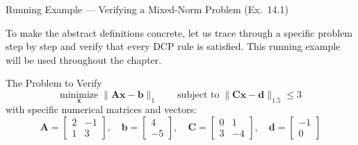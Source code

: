 \documentclass[aspectratio=169,10pt]{beamer}
\begin{document}
\begin{frame}[allowframebreaks]{Running Example --- Verifying a Mixed-Norm Problem (Ex.\ 14.1)}

  To make the abstract definitions concrete, let us trace through a
  specific problem step by step and verify that every DCP rule is
  satisfied.  This running example will be used throughout the chapter.

  \begin{exampleblock}{The Problem to Verify}
    \[
      \underset{\mathbf{x}}{\mathrm{minimize}}\;
      \|\mathbf{A}\mathbf{x} - \mathbf{b}\|_1
      \qquad
      \text{subject to}\;
      \|\mathbf{C}\mathbf{x} - \mathbf{d}\|_{1.5} \leq 3
    \]
    with specific numerical matrices and vectors:
    \[
      \mathbf{A}=\begin{bmatrix}2&-1\\1&3\end{bmatrix},\quad
      \mathbf{b}=\begin{bmatrix}4\\-5\end{bmatrix},\quad
      \mathbf{C}=\begin{bmatrix}0&1\\3&-4\end{bmatrix},\quad
      \mathbf{d}=\begin{bmatrix}-1\\0\end{bmatrix}
    \]
  \end{exampleblock}


\end{frame}
\end{document}
